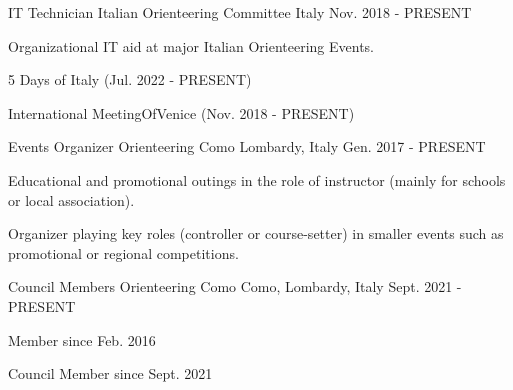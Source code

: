 

\begin{cventries}

  \cventry
  {IT Technician} %
  {Italian Orienteering Committee} %
  {Italy} %
  {Nov. 2018 - PRESENT} %
  {
    \begin{cvitems} %
      \item {Organizational IT aid at major Italian Orienteering Events.}
      \item {5 Days of Italy (Jul. 2022 - PRESENT)}
      \item {International MeetingOfVenice (Nov. 2018 - PRESENT)}
    \end{cvitems}
  }

  \cventry
  {Events Organizer} %
  {Orienteering Como} %
  {Lombardy, Italy} %
  {Gen. 2017 - PRESENT} %
  {
    \begin{cvitems} %
      \item {Educational and promotional outings in the role of instructor (mainly for schools or local association).}
      \item {Organizer playing key roles (controller or course-setter) in smaller events such as promotional or regional competitions.}
    \end{cvitems}
  }

  \cventry
  {Council Members} %
  {Orienteering Como} %
  {Como, Lombardy, Italy} %
  {Sept. 2021 - PRESENT} %
  {
    \begin{cvitems} %
      \item {Member since Feb. 2016}
      \item {Council Member since Sept. 2021}
    \end{cvitems}
  }

\end{cventries}

